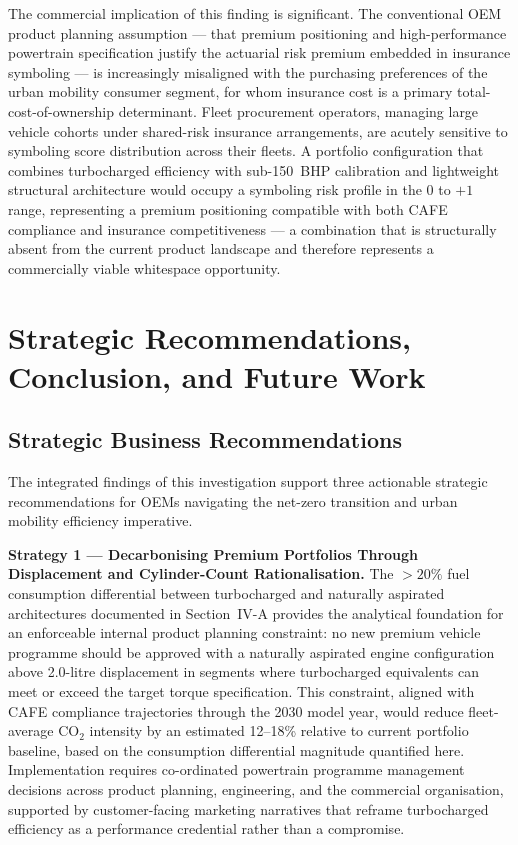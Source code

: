 \documentclass[conference]{IEEEtran}
\begin{document}
The commercial implication of this finding is significant. The
conventional OEM product planning assumption — that premium
positioning and high-performance powertrain specification justify
the actuarial risk premium embedded in insurance symboling — is
increasingly misaligned with the purchasing preferences of the
urban mobility consumer segment, for whom insurance cost is a
primary total-cost-of-ownership determinant. Fleet procurement
operators, managing large vehicle cohorts under shared-risk
insurance arrangements, are acutely sensitive to symboling score
distribution across their fleets. A portfolio configuration that
combines turbocharged efficiency with sub-150~BHP calibration
and lightweight structural architecture would occupy a symboling
risk profile in the $0$ to $+1$ range, representing a premium
positioning compatible with both CAFE compliance and insurance
competitiveness — a combination that is structurally absent from
the current product landscape and therefore represents a
commercially viable whitespace opportunity.

\section{Strategic Recommendations, Conclusion, and Future Work}

\subsection{Strategic Business Recommendations}

The integrated findings of this investigation support three
actionable strategic recommendations for OEMs navigating
the net-zero transition and urban mobility efficiency imperative.

\textbf{Strategy 1 — Decarbonising Premium Portfolios Through
Displacement and Cylinder-Count Rationalisation.}
The $>20\%$ fuel consumption differential between turbocharged
and naturally aspirated architectures documented in Section~IV-A
provides the analytical foundation for an enforceable internal
product planning constraint: no new premium vehicle programme
should be approved with a naturally aspirated engine configuration
above 2.0-litre displacement in segments where turbocharged
equivalents can meet or exceed the target torque specification.
This constraint, aligned with CAFE compliance trajectories through
the 2030 model year, would reduce fleet-average CO$_2$ intensity
by an estimated 12--18\% relative to current portfolio baseline,
based on the consumption differential magnitude quantified here.
Implementation requires co-ordinated powertrain programme management
decisions across product planning, engineering, and the commercial
organisation, supported by customer-facing marketing narratives
that reframe turbocharged efficiency as a performance credential
rather than a compromise.
\end{document}
